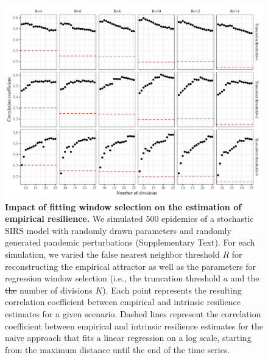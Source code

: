 \documentclass[12pt]{article}
\providecommand{\DIFdeltex}[1]{{\protect\color{red}\sout{#1}}}                      %
\providecommand{\DIFdelFL}[1]{\DIFdel{#1}} %
\providecommand{\DIFdelbeginFL}{} %
\providecommand{\DIFdelendFL}{} %
\providecommand{\DIFdel}[1]{\texorpdfstring{\DIFdeltex{#1}}{}} %
\newcommand{\DIFscaledelfig}{0.5}
\newlength{\DIFdelgraphicswidth} %
\newlength{\DIFdelgraphicsheight} %
\newcommand{\DIFdelincludegraphics}[2][]{%
\sbox{\DIFdelgraphicsbox}{\DIFOincludegraphics[#1]{#2}}%
\settoboxwidth{\DIFdelgraphicswidth}{\DIFdelgraphicsbox} %
\settoboxtotalheight{\DIFdelgraphicsheight}{\DIFdelgraphicsbox} %
\scalebox{\DIFscaledelfig}{%
\parbox[b]{\DIFdelgraphicswidth}{\usebox{\DIFdelgraphicsbox}\\[-\baselineskip] \rule{\DIFdelgraphicswidth}{0em}}\llap{\resizebox{\DIFdelgraphicswidth}{\DIFdelgraphicsheight}{%
\setlength{\unitlength}{\DIFdelgraphicswidth}%
\begin{picture}(1,1)%
\thicklines\linethickness{2pt} %
{\color[rgb]{1,0,0}\put(0,0){\framebox(1,1){}}}%
{\color[rgb]{1,0,0}\put(0,0){\line( 1,1){1}}}%
{\color[rgb]{1,0,0}\put(0,1){\line(1,-1){1}}}%
\end{picture}%
}\hspace*{3pt}}} %
} %
\DeclareRobustCommand{\DIFdelbeginFL}{\DIFOdelbeginFL \let\includegraphics\DIFdelincludegraphics} %
\DeclareRobustCommand{\DIFdelendFL}{\DIFOaddendFL \let\includegraphics\DIFOincludegraphics} %
\begin{document}
\begin{figure}[!th]
\includegraphics[width=\textwidth]{../figure_analysis_random/figure_analysis_random.pdf}
\caption{
\textbf{Impact of fitting window selection on the estimation of empirical resilience.}
We simulated 500 epidemics of a stochastic SIRS model with randomly drawn parameters and randomly generated pandemic perturbations (Supplementary Text).
For each simulation, we varied the false nearest neighbor threshold $R$ for reconstructing the empirical attractor as well as the parameters for regression window selection (i.e., the truncation threshold $a$ and the \DIFdelbeginFL \DIFdelFL{the }\DIFdelendFL number of divisions $K$).
Each point represents the resulting correlation coefficient between empirical and intrinsic resilience estimates for a given scenario.
Dashed lines represent the correlation coefficient between empirical and intrinsic resilience estimates for the naive approach that fits a linear regression on a log scale, starting from the maximum distance until the end of the time series.
}
\end{figure}

\pagebreak
\end{document}
